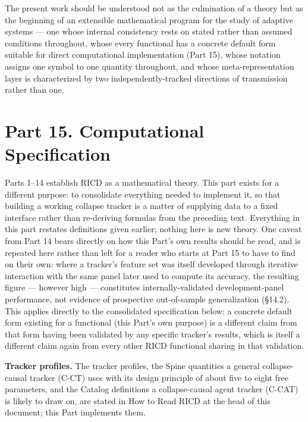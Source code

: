 \documentclass[
]{article}
\begin{document}
The present work should be understood not as the culmination of a theory
but as the beginning of an extensible mathematical program for the study
of adaptive systems --- one whose internal consistency rests on stated
rather than assumed conditions throughout, whose every functional has a
concrete default form suitable for direct computational implementation
(Part 15), whose notation assigns one symbol to one quantity throughout,
and whose meta-representation layer is characterized by two
independently-tracked directions of transmission rather than one.

\hypertarget{part-15.-computational-specification}{%
\section{Part 15. Computational
Specification}\label{part-15.-computational-specification}}

Parts 1--14 establish RICD as a mathematical theory. This part exists
for a different purpose: to consolidate everything needed to implement
it, so that building a working collapse tracker is a matter of supplying
data to a fixed interface rather than re-deriving formulas from the
preceding text. Everything in this part restates definitions given
earlier; nothing here is new theory. One caveat from Part 14 bears
directly on how this Part's own results should be read, and is repeated
here rather than left for a reader who starts at Part 15 to have to find
on their own: where a tracker's feature set was itself developed through
iterative interaction with the same panel later used to compute its
accuracy, the resulting figure --- however high --- constitutes
internally-validated development-panel performance, not evidence of
prospective out-of-sample generalization (§14.2). This applies directly
to the consolidated specification below: a concrete default form
existing for a functional (this Part's own purpose) is a different claim
from that form having been validated by any specific tracker's results,
which is itself a different claim again from every other RICD functional
sharing in that validation.

\textbf{Tracker profiles.} The tracker profiles, the Spine quantities a
general collapse-causal tracker (C-CT) uses with its design principle of
about five to eight free parameters, and the Catalog definitions a
collapse-causal agent tracker (C-CAT) is likely to draw on, are stated
in How to Read RICD at the head of this document; this Part implements
them.
\end{document}
